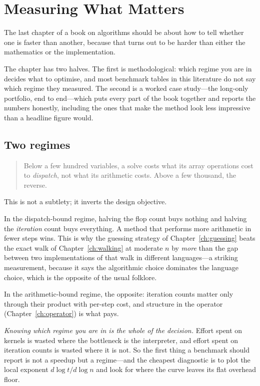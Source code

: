 \chapter{Measuring What Matters}
\label{ch:measurement}

The last chapter of a book on algorithms should be about how to tell whether one is
faster than another, because that turns out to be harder than either the mathematics or
the implementation.

The chapter has two halves. The first is methodological: which regime you are in
decides what to optimise, and most benchmark tables in this literature do not say which
regime they measured. The second is a worked case study---the long-only portfolio, end
to end---which puts every part of the book together and reports the numbers honestly,
including the ones that make the method look less impressive than a headline figure
would.

\section{Two regimes}

\begin{quote}
Below a few hundred variables, a solve costs what its array operations cost to
\emph{dispatch}, not what its arithmetic costs. Above a few thousand, the reverse.
\end{quote}

This is not a subtlety; it inverts the design objective.

In the dispatch-bound regime, halving the flop count buys nothing and halving the
\emph{iteration} count buys everything. A method that performs more arithmetic in fewer
steps wins. This is why the guessing strategy of Chapter~\ref{ch:guessing} beats the
exact walk of Chapter~\ref{ch:walking} at moderate $n$ by \emph{more} than the gap
between two implementations of that walk in different languages---a striking measurement,
because it says the algorithmic choice dominates the language choice, which is the
opposite of the usual folklore.

In the arithmetic-bound regime, the opposite: iteration counts matter only through their
product with per-step cost, and structure in the operator (Chapter~\ref{ch:operator})
is what pays.

\emph{Knowing which regime you are in is the whole of the decision.} Effort spent on
kernels is wasted where the bottleneck is the interpreter, and effort spent on iteration
counts is wasted where it is not. So the first thing a benchmark should report is not a
speedup but a regime---and the cheapest diagnostic is to plot the local exponent
$d\log t/d\log n$ and look for where the curve leaves its flat overhead floor.

